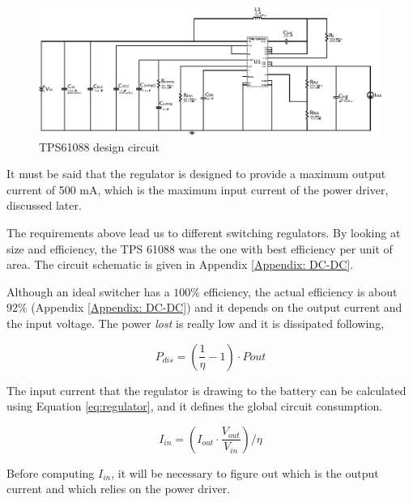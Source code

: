 \begin{figure}[H]
  \begin{center}
    \includegraphics[width=1.05\textwidth]{./images/TPS61088}
  \caption{TPS61088 design circuit}
  \end{center}
\end{figure}

It must be said that the regulator is designed to provide a maximum output current of 500 mA, which is the maximum input current of the power driver, discussed later.

The requirements above lead us to different switching regulators. By looking at size and efficiency, the TPS 61088 was the one with best efficiency per unit of area. The circuit schematic is given in Appendix \ref{Appendix: DC-DC}.

Although an ideal switcher has a $100\%$ efficiency, the actual efficiency is about $92\%$ (Appendix \ref{Appendix: DC-DC}) and it depends on the output current and the input voltage. The power \textit{lost} is really low and it is dissipated following,

\begin{equation}
P_{dis} = \left(\frac{1}{\eta}-1\right)\cdot{P{out}}
\end{equation}


The input current that the regulator is drawing to the battery can be calculated using Equation \ref{eq:regulator}, and it defines the global circuit consumption. 

\begin{equation}\label{eq:regulator}
I_{in} = \left({I_{out}}\cdot\frac{V_{out}}{V_{in}}\right)/{\eta}
\end{equation}

Before computing $I_{in}$, it will be necessary to figure out which is the output current and which relies on the power driver. 









